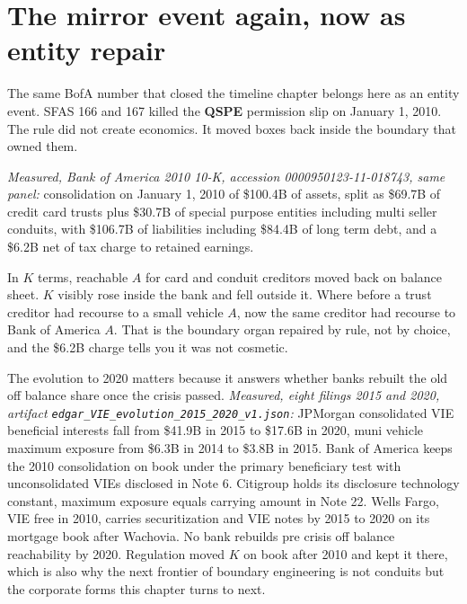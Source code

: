 \section{The mirror event again, now as entity repair}

The same BofA number that closed the timeline chapter belongs here as an entity event. SFAS 166 and 167 killed the \textbf{QSPE} permission slip on January 1, 2010. The rule did not create economics. It moved boxes back inside the boundary that owned them.

\textit{Measured, Bank of America 2010 10-K, accession 0000950123-11-018743, same panel:} consolidation on January 1, 2010 of \$100.4B of assets, split as \$69.7B of credit card trusts plus \$30.7B of special purpose entities including multi seller conduits, with \$106.7B of liabilities including \$84.4B of long term debt, and a \$6.2B net of tax charge to retained earnings.

In $K$ terms, reachable $A$ for card and conduit creditors moved back on balance sheet. $K$ visibly rose inside the bank and fell outside it. Where before a trust creditor had recourse to a small vehicle $A$, now the same creditor had recourse to Bank of America $A$. That is the boundary organ repaired by rule, not by choice, and the \$6.2B charge tells you it was not cosmetic.

The evolution to 2020 matters because it answers whether banks rebuilt the old off balance share once the crisis passed. \textit{Measured, eight filings 2015 and 2020, artifact \texttt{edgar\_VIE\_evolution\_2015\_2020\_v1.json}:} JPMorgan consolidated VIE beneficial interests fall from \$41.9B in 2015 to \$17.6B in 2020, muni vehicle maximum exposure from \$6.3B in 2014 to \$3.8B in 2015. Bank of America keeps the 2010 consolidation on book under the primary beneficiary test with unconsolidated VIEs disclosed in Note 6. Citigroup holds its disclosure technology constant, maximum exposure equals carrying amount in Note 22. Wells Fargo, VIE free in 2010, carries securitization and VIE notes by 2015 to 2020 on its mortgage book after Wachovia. No bank rebuilds pre crisis off balance reachability by 2020. Regulation moved $K$ on book after 2010 and kept it there, which is also why the next frontier of boundary engineering is not conduits but the corporate forms this chapter turns to next.

